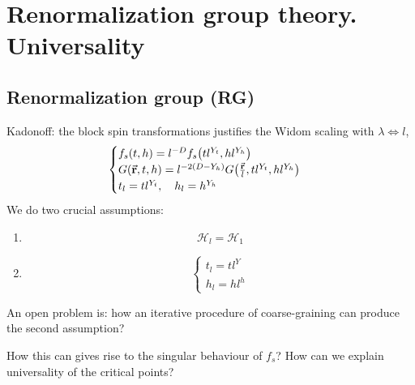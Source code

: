 \documentclass[../main/main.tex]{subfiles}
\begin{document}
\chapter{Renormalization group theory. Universality}


\section{Renormalization group (RG)}
Kadonoff: the block spin transformations justifies the Widom scaling with \( \lambda \iff l \),
\begin{equation}
  \begin{cases}
   f_s (t,h) = l^{-D} f_s \qty(t l^{Y_t}, h l^{Y_h}) \\
   G (\va{r},t,h) = l^{-2(D-Y_h)} G \qty(\frac{\va{r}}{l}, t l^{Y_t}, h l^{Y_h}) \\
   t_l = t l ^{Y_t}, \quad h_l = h^{Y_h}
  \end{cases}
\end{equation}
We do two crucial assumptions:
\begin{enumerate}
\item  \begin{equation}
  \mathcal{H}_l = \mathcal{H}_1
\end{equation}
\item \begin{equation}
  \begin{cases}
   t_l = t l^{Y}\\
   h_l = h l^{h}
  \end{cases}
\end{equation}
\end{enumerate}

\begin{remark}
An open problem is: how an iterative procedure of coarse-graining can produce the second assumption?
\end{remark}
How this can gives rise to the singular behaviour of \( f_s \)? How can we explain universality of the critical points?
\end{document}
